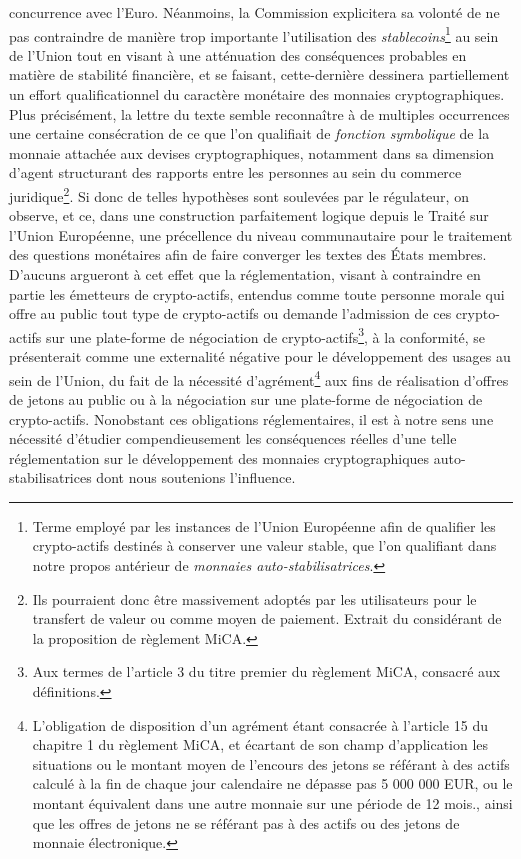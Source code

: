 {concurrence avec l'Euro. Néanmoins, la Commission explicitera sa volonté de ne pas contraindre de manière trop importante l'utilisation des \emph{stablecoins}\footnote{Terme employé par les instances de l'Union Européenne afin de qualifier les crypto-actifs destinés à conserver une valeur stable, que l'on qualifiant dans notre propos antérieur de \emph{monnaies auto-stabilisatrices}.} au sein de l'Union tout en visant à une atténuation des conséquences probables en matière de stabilité financière, et se faisant, cette-dernière dessinera partiellement un effort qualificationnel du caractère monétaire des monnaies cryptographiques. Plus précisément, la lettre du texte semble reconnaître à de multiples occurrences une certaine consécration de ce que l'on qualifiait de \emph{fonction symbolique} de la monnaie attachée aux devises cryptographiques, notamment dans sa dimension d'agent structurant des rapports entre les personnes au sein du commerce juridique\footnote{\og Ils pourraient donc être massivement adoptés par les utilisateurs pour le transfert de valeur ou comme moyen de paiement\fg{}. Extrait du considérant  de la proposition de règlement MiCA.}. Si donc de telles hypothèses sont soulevées par le régulateur, on observe, et ce, dans une construction parfaitement logique depuis le Traité sur l'Union Européenne, une précellence du niveau communautaire pour le traitement des questions monétaires afin de faire converger les textes des États membres. D'aucuns argueront à cet effet que la réglementation, visant à contraindre en partie les émetteurs de crypto-actifs, entendus comme \og toute personne morale qui offre au public tout type de crypto-actifs ou demande l'admission de ces crypto-actifs sur une plate-forme de négociation de crypto-actifs\fg{}\footnote{Aux termes de l'article 3 du titre premier du règlement MiCA, consacré aux définitions.}, à la conformité, se présenterait comme une externalité négative pour le développement des usages au sein de l'Union, du fait de la nécessité d'agrément\footnote{L'obligation de disposition d'un agrément étant consacrée à l'article 15 du chapitre 1 du règlement MiCA, et écartant de son champ d'application les situations ou \og le montant moyen de l'encours des jetons se référant à des actifs calculé à la fin de chaque jour calendaire ne dépasse pas 5 000 000 EUR, ou le montant équivalent dans une autre monnaie sur une période de 12 mois.\fg{}, ainsi que les offres de jetons ne se référant pas à des actifs ou des jetons de monnaie électronique.} aux fins de réalisation d'offres de jetons au public ou à la négociation sur une plate-forme de négociation de crypto-actifs. Nonobstant ces obligations réglementaires, il est à notre sens une nécessité d'étudier compendieusement les conséquences réelles d'une telle réglementation sur le développement des monnaies cryptographiques auto-stabilisatrices dont nous soutenions l'influence.\par

}
